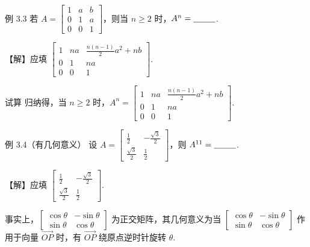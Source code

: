 \begin{fcard}{例 3.3}
若 $A=\begin{bmatrix}1&a&b\\0&1&a\\0&0&1\end{bmatrix}$，则当 $n\ge2$ 时，$A^n=\underline{\hspace{2.6em}}$.
\end{fcard}

【解】应填 $\begin{bmatrix}1&na&\frac{n(n-1)}{2}a^2+nb\\0&1&na\\0&0&1\end{bmatrix}$.

试算
归纳得，当 $n\ge2$ 时，$A^n=\begin{bmatrix}1&na&\frac{n(n-1)}{2}a^2+nb\\0&1&na\\0&0&1\end{bmatrix}$.

\begin{fcard}{例 3.4\quad（有几何意义）}
设 $A=\begin{bmatrix}\frac12&-\frac{\sqrt3}{2}\\\frac{\sqrt3}{2}&\frac12\end{bmatrix}$，则 $A^{11}=\underline{\hspace{2.6em}}$.
\end{fcard}

【解】应填 $\begin{bmatrix}\frac12&-\frac{\sqrt3}{2}\\\frac{\sqrt3}{2}&\frac12\end{bmatrix}$.

事实上，$\begin{bmatrix}\cos\theta&-\sin\theta\\\sin\theta&\cos\theta\end{bmatrix}$ 为正交矩阵，其几何意义为当 $\begin{bmatrix}\cos\theta&-\sin\theta\\\sin\theta&\cos\theta\end{bmatrix}$ 作用于向量 $\overrightarrow{OP}$ 时，有 $\overrightarrow{OP}$ 绕原点逆时针旋转 $\theta$.

